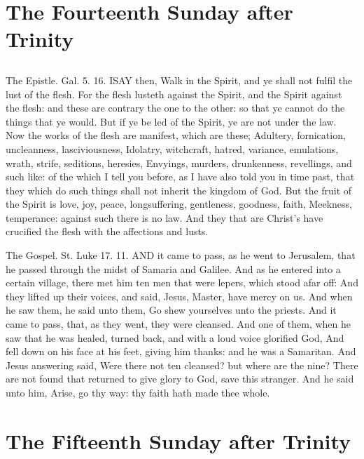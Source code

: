 \section{The Fourteenth Sunday after Trinity}
\subsection{}


The Epistle. Gal. 5. 16.
ISAY then, Walk in the Spirit, and ye shall not fulfil the lust of the flesh. For the flesh lusteth against the Spirit, and the Spirit against the flesh: and these are contrary the one to the other: so that ye cannot do the things that ye would. But if ye be led of the Spirit, ye are not under the law. Now the works of the flesh are manifest, which are these; Adultery, fornication, uncleanness, lasciviousness, Idolatry, witchcraft, hatred, variance, emulations, wrath, strife, seditions, heresies, Envyings, murders, drunkenness, revellings, and such like: of the which I tell you before, as I have also told you in time past, that they which do such things shall not inherit the kingdom of God. But the fruit of the Spirit is love, joy, peace, longsuffering, gentleness, goodness, faith, Meekness, temperance: against such there is no law. And they that are Christ's have crucified the flesh with the affections and lusts.


The Gospel. St. Luke 17. 11.
AND it came to pass, as he went to Jerusalem, that he passed through the midst of Samaria and Galilee. And as he entered into a certain village, there met him ten men that were lepers, which stood afar off: And they lifted up their voices, and said, Jesus, Master, have mercy on us. And when he saw them, he said unto them, Go shew yourselves unto the priests. And it came to pass, that, as they went, they were cleansed. And one of them, when he saw that he was healed, turned back, and with a loud voice glorified God, And fell down on his face at his feet, giving him thanks: and he was a Samaritan. And Jesus answering said, Were there not ten cleansed? but where are the nine? There are not found that returned to give glory to God, save this stranger. And he said unto him, Arise, go thy way: thy faith hath made thee whole.

\section{The Fifteenth Sunday after Trinity}
